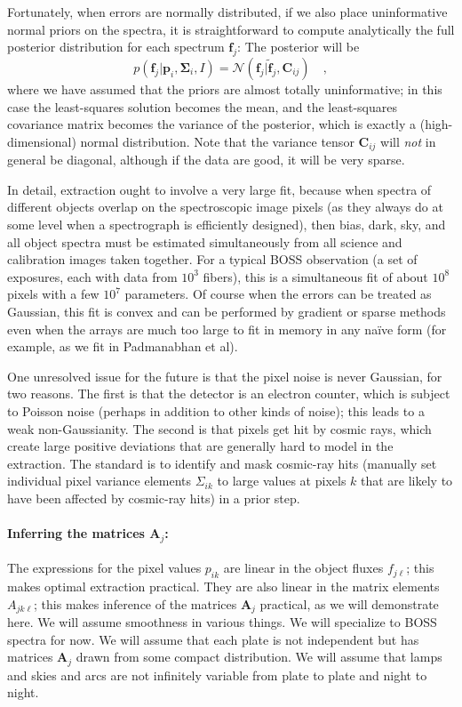 \documentclass[12pt]{article}
\newcommand{\hmatrix}[1]{\boldsymbol{#1}}
\newcommand{\Amatrix}{\hmatrix{A}}
\newcommand{\pixels}{\hmatrix{p}}
\newcommand{\flux}{\hmatrix{f}}
\newcommand{\fluxLSF}{\hmatrix{\tilde{f}}}
\newcommand{\pixelvariance}{\hmatrix{\Sigma}}
\newcommand{\covariance}{\hmatrix{C}}
\newcommand{\Normal}{\mathscr{N}}
\begin{document}
Fortunately, when errors are normally distributed, if we also place
uninformative normal priors on the spectra, it is straightforward to
compute analytically the full posterior distribution for each spectrum
$\flux_j$: The posterior will be
\begin{equation}
p(\flux_j|\pixels_i,\pixelvariance_i,I) =
  \Normal(\flux_j|\fluxLSF_j,\covariance_{ij}) \quad,
\end{equation}
where we have assumed that the priors are almost totally
uninformative; in this case the least-squares solution becomes the
mean, and the least-squares covariance matrix becomes the variance of
the posterior, which is exactly a (high-dimensional) normal
distribution.  Note that the variance tensor $\covariance_{ij}$ will
\emph{not} in general be diagonal, although if the data are good, it
will be very sparse.

In detail, extraction ought to involve a very large fit, because when
spectra of different objects overlap on the spectroscopic image pixels
(as they always do at some level when a spectrograph is efficiently
designed), then bias, dark, sky, and all object spectra must be
estimated simultaneously from all science and calibration images taken
together.  For a typical BOSS observation (a set of exposures, each
with data from $10^3$ fibers), this is a simultaneous fit of about
$10^8$ pixels with a few $10^7$ parameters.  Of course when the errors
can be treated as Gaussian, this fit is convex and can be performed by
gradient or sparse methods even when the arrays are much too large to
fit in memory in any na\"ive form (for example, as we fit in
Padmanabhan et al).

One unresolved issue for the future is that the pixel noise is never
Gaussian, for two reasons.  The first is that the detector is an
electron counter, which is subject to Poisson noise (perhaps in
addition to other kinds of noise); this leads to a weak
non-Gaussianity.  The second is that pixels get hit by cosmic rays,
which create large positive deviations that are generally hard to
model in the extraction.  The standard is to identify and mask
cosmic-ray hits (manually set individual pixel variance elements
$\Sigma_{ik}$ to large values at pixels $k$ that are likely to have
been affected by cosmic-ray hits) in a prior step.

\paragraph{Inferring the matrices $\Amatrix_j$:}
The expressions for the pixel values $p_{ik}$ are linear in the object
fluxes $f_{j\ell}$; this makes optimal extraction practical.  They are
also linear in the matrix elements $A_{jk\ell}$; this makes inference
of the matrices $\Amatrix_j$ practical, as we will demonstrate here.
We will assume smoothness in various things.  We will specialize to
BOSS spectra for now.  We will assume that each plate is not
independent but has matrices $\Amatrix_j$ drawn from some compact
distribution. We will assume that lamps and skies and arcs are not
infinitely variable from plate to plate and night to night.
\end{document}
